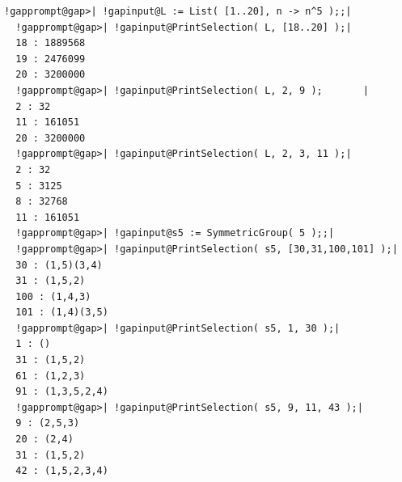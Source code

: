 \documentclass[a4paper,11pt]{report}
\begin{document}
{{\begin{Verbatim}[commandchars=!@|,fontsize=\small,frame=single,label=Example]
  !gapprompt@gap>| !gapinput@L := List( [1..20], n -> n^5 );;|
  !gapprompt@gap>| !gapinput@PrintSelection( L, [18..20] );|
  18 : 1889568
  19 : 2476099
  20 : 3200000
  !gapprompt@gap>| !gapinput@PrintSelection( L, 2, 9 );       |
  2 : 32
  11 : 161051
  20 : 3200000
  !gapprompt@gap>| !gapinput@PrintSelection( L, 2, 3, 11 );|
  2 : 32
  5 : 3125
  8 : 32768
  11 : 161051
  !gapprompt@gap>| !gapinput@s5 := SymmetricGroup( 5 );;|
  !gapprompt@gap>| !gapinput@PrintSelection( s5, [30,31,100,101] );|
  30 : (1,5)(3,4)
  31 : (1,5,2)
  100 : (1,4,3)
  101 : (1,4)(3,5)
  !gapprompt@gap>| !gapinput@PrintSelection( s5, 1, 30 );|
  1 : ()
  31 : (1,5,2)
  61 : (1,2,3)
  91 : (1,3,5,2,4)
  !gapprompt@gap>| !gapinput@PrintSelection( s5, 9, 11, 43 );|
  9 : (2,5,3)
  20 : (2,4)
  31 : (1,5,2)
  42 : (1,5,2,3,4)
  
\end{Verbatim}
 }

 }

         
\end{document}
